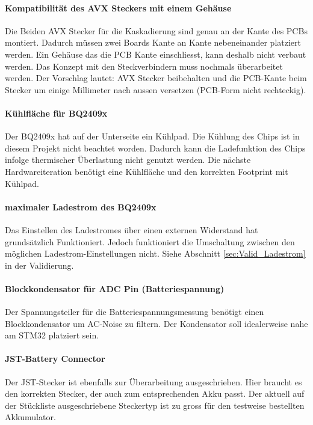 \paragraph{Kompatibilität des AVX Steckers mit einem Gehäuse}

Die Beiden AVX Stecker für die Kaskadierung sind genau an der Kante des PCBs montiert. Dadurch müssen zwei Boards Kante an Kante nebeneinander platziert werden.
Ein Gehäuse das die PCB Kante einschliesst, kann deshalb nicht verbaut werden.
Das Konzept mit den Steckverbindern muss nochmals überarbeitet werden.
Der Vorschlag lautet: AVX Stecker beibehalten und die PCB-Kante beim Stecker um einige Millimeter nach aussen versetzen (PCB-Form nicht rechteckig).

\paragraph{Kühlfläche für BQ2409x}

Der BQ2409x hat auf der Unterseite ein Kühlpad. Die Kühlung des Chips ist in diesem Projekt nicht beachtet worden. Dadurch kann die Ladefunktion des Chips infolge thermischer Überlastung nicht genutzt werden. Die nächste Hardwareiteration benötigt eine Kühlfläche und den korrekten Footprint mit Kühlpad.

\paragraph{maximaler Ladestrom des BQ2409x}

Das Einstellen des Ladestromes über einen externen Widerstand hat grundsätzlich Funktioniert. Jedoch funktioniert die Umschaltung zwischen den möglichen Ladestrom-Einstellungen nicht.
Siehe Abschnitt \ref{sec:Valid_Ladestrom} in der Validierung.

\paragraph{Blockkondensator für ADC Pin (Batteriespannung)}

Der Spannungsteiler für die Batteriespannungsmessung benötigt einen Blockkondensator um AC-Noise zu filtern. Der Kondensator soll idealerweise nahe am STM32 platziert sein.

\paragraph{JST-Battery Connector}

Der JST-Stecker ist ebenfalls zur Überarbeitung ausgeschrieben. Hier braucht es den korrekten Stecker, der auch zum entsprechenden Akku passt. 
Der aktuell auf der Stückliste ausgeschriebene Steckertyp ist zu gross für den testweise bestellten Akkumulator.


